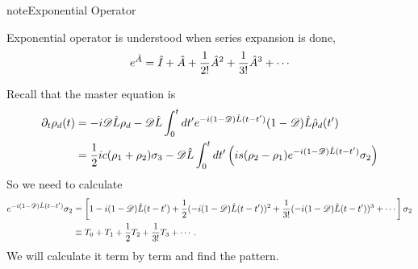 \documentclass[letterpaper,12pt,english]{sphinxmanual}
\begin{document}
\begin{notice}{note}{Exponential Operator}

Exponential operator is understood when series expansion is done,
\begin{gather}
\begin{split}e^{\hat A} = \hat I + \hat A + \frac{1}{2!}{\hat A}^2 + \frac{1}{3!} {\hat A}^3 +\cdots\end{split}\notag
\end{gather}\end{notice}

Recall that the master equation is
\begin{gather}
\begin{split}\partial_t \rho_d(t) &= - i \mathscr D \hat L \rho_d - \mathscr D\hat L \int_0^t dt' e^{-i(1-\mathscr D)\hat L (t-t')} (1-\mathscr D) \hat L \hat \rho_d(t') \\
& = \frac{1}{2}ic(\rho_1+\rho_2)\sigma_3 - \mathscr D\hat L \int_0^t dt' \left( i s (\rho_2-\rho_1) e^{-i(1-\mathscr D)\hat L (t-t')} \sigma_2  \right) \\\end{split}\notag
\end{gather}
So we need to calculate
\begin{gather}
\begin{split}e^{-i(1-\mathscr D)\hat L (t-t')} \sigma_2 &= \left[1 -i(1-\mathscr D)\hat L (t-t')  + \frac{1}{2} (-i(1-\mathscr D)\hat L (t-t') )^2 + \frac{1}{3!}(-i(1-\mathscr D)\hat L (t-t') )^3 + \cdots \right]\sigma_2\\
&\equiv T_0 + T_1 + \frac{1}{2} T_2 +  \frac{1}{3!}T_3 + \cdots .\end{split}\notag
\end{gather}
We will calculate it term by term and find the pattern.
\end{document}
